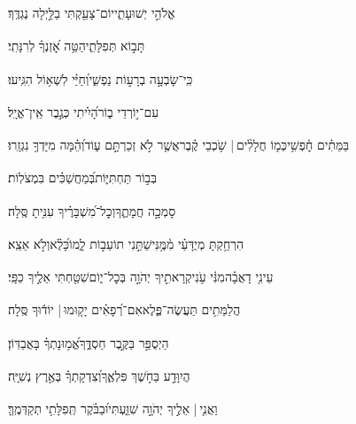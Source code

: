\documentclass[12pt]{article}
\newcommand{\loc}[1]{\textsuperscript{\locf{#1}}}
\begin{document}
{\loc{ ב}~}‏ אֱלֹהֵ֣י יְשׁוּעָתִ֑י{\hfill}יוֹם־צָעַ֖קְתִּי בַלַּ֣יְלָה נֶגְדֶּֽךָ׃\par

{\loc{ ג}~}‏תָּב֣וֹא  תְּפִלָּתִ֑י{\hfill}הַטֵּ֥ה אׇ֝זְנְךָ֗ לְרִנָּתִֽי׃\par

{\loc{ ד}~}‏כִּֽי־שָׂבְעָ֣ה בְרָע֣וֹת נַפְשִׁ֑י{\hfill}וְ֝חַיַּ֗י לִשְׁא֥וֹל הִגִּֽיעוּ׃\par

{\loc{ ה}~}‏ עִם־י֣וֹרְדֵי ב֑וֹר{\hfill}הָ֝יִ֗יתִי כְּגֶ֣בֶר אֵֽין־אֱיָֽל׃\par

{\loc{ ו}~}‏בַּמֵּתִ֗ים חׇ֫פְשִׁ֥י{\hfill}כְּמ֤וֹ חֲלָלִ֨ים |  שֹׁ֥כְבֵי קֶ֗בֶר\newline\hspace*{.5em}אֲשֶׁ֤ר לֹ֣א זְכַרְתָּ֣ם ע֑וֹד{\hfill}וְ֝הֵ֗מָּה מִיָּדְךָ֥ נִגְזָֽרוּ׃\par

{\loc{ ז}~}‏ בְּב֣וֹר תַּחְתִּיּ֑וֹת{\hfill}בְּ֝מַחֲשַׁכִּ֗ים בִּמְצֹלֽוֹת׃\par

{\loc{ ח}~}‏ סָמְכָ֣ה חֲמָתֶ֑ךָ{\hfill}וְכׇל־מִ֝שְׁבָּרֶ֗יךָ עִנִּ֥יתָ סֶּֽלָה׃\par

{\loc{ ט}~}‏הִרְחַ֥קְתָּ מְיֻדָּעַ֗י מִ֫מֶּ֥נִּי{\hfill}שַׁתַּ֣נִי תוֹעֵב֣וֹת לָ֑מוֹ\newline\hspace*{.5em}כָּ֝לֻ֗א{\hfill}וְלֹ֣א אֵצֵֽא׃\par

{\loc{ י}~}‏עֵינִ֥י דָאֲבָ֗ה{\hfill}מִנִּ֫י עֹ֥נִי\newline\hspace*{.5em}קְרָאתִ֣יךָ יְהֹוָ֣ה בְּכׇל־י֑וֹם{\hfill}שִׁטַּ֖חְתִּי אֵלֶ֣יךָ כַפָּֽי׃\par

{\loc{ יא}~}‏הֲלַמֵּתִ֥ים תַּעֲשֶׂה־פֶּ֑לֶא{\hfill}אִם־רְ֝פָאִ֗ים יָק֤וּמוּ |  יוֹד֬וּךָ סֶּֽלָה׃\par

{\loc{ יב}~}‏הַיְסֻפַּ֣ר בַּקֶּ֣בֶר חַסְדֶּ֑ךָ{\hfill}אֱ֝מ֥וּנָתְךָ֗ בָּאֲבַדּֽוֹן׃\par

{\loc{ יג}~}‏הֲיִוָּדַ֣ע בַּחֹ֣שֶׁךְ פִּלְאֶ֑ךָ{\hfill}וְ֝צִדְקָתְךָ֗ בְּאֶ֣רֶץ נְשִׁיָּֽה׃\par

{\loc{ יד}~}‏וַאֲנִ֤י |  אֵלֶ֣יךָ יְהֹוָ֣ה שִׁוַּ֑עְתִּי{\hfill}וּ֝בַבֹּ֗קֶר תְּֽפִלָּתִ֥י תְקַדְּמֶֽךָּ׃\par
\end{document}
